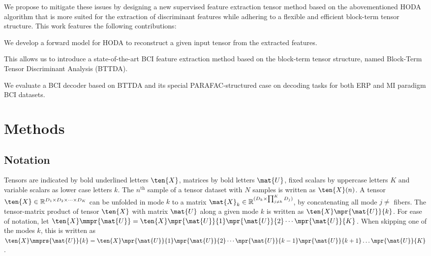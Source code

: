 
We propose to mitigate these issues by designing a new supervised feature
extraction tensor method based on the abovementioned HODA algorithm
that is more suited for the extraction of discriminant
features while adhering to a flexible and efficient block-term tensor
structure.
This work features the following contributions:
\begin{enumerate*}[label={\arabic*)}]
	\item  We develop a forward model for HODA to reconstruct a
	      given input tensor from the extracted features.
	\item This allows us to introduce a state-of-the-art BCI feature extraction
        method based on the block-term tensor structure, named Block-Term Tensor Discriminant Analysis
	      (BTTDA).
  \item We evaluate a BCI decoder based on BTTDA and its special
	      PARAFAC-structured case on decoding tasks for both ERP and MI
	      paradigm BCI datasets.
\end{enumerate*}

\section{Methods}

\subsection{Notation}
Tensors are indicated by bold underlined letters $\ten{X}$, matrices by bold
letters $\mat{U}$, fixed scalars by uppercase letters $K$ and variable
scalars as lower case letters $k$.
The $n^\text{th}$ sample of a tensor dataset with $N$ samples is written as
$\ten{X}(n)$.
A tensor $\ten{X}\in \mathbb{R}^{D_1\times D_2 \times \cdots \times D_K}$ can be
unfolded in mode $k$ to a matrix
$\mat{X}_k\in\mathbb{R}^{(D_k\times\prod_{j\neq k}^K D_j)}$, by concatenating
all mode $j\neq$ fibers.
The tensor-matrix product of tensor $\ten{X}$ with matrix $\mat{U}$ along a
given mode $k$ is written as $\ten{X}\mpr{\mat{U}}{k}$. For ease of notation, let
$\ten{X}\mmpr{\mat{U}} =
	\ten{X}\mpr{\mat{U}}{1}\mpr{\mat{U}}{2}\cdots\mpr{\mat{U}}{K}$.
When skipping one of the modes $k$, this is
written as $\ten{X}\mmprs{\mat{U}}{k} =
	\ten{X}\mpr{\mat{U}}{1}\mpr{\mat{U}}{2}\cdots\mpr{\mat{U}}{k-1}\mpr{\mat{U}}{k+1}\ldots\mpr{\mat{U}}{K}$.

